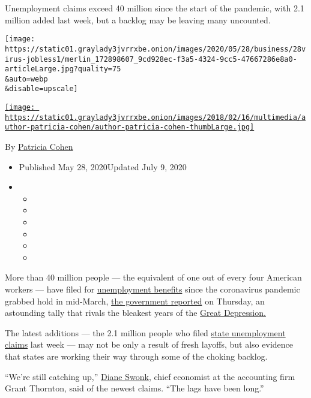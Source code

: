 Unemployment claims exceed 40 million since the start of the pandemic,
with 2.1 million added last week, but a backlog may be leaving many
uncounted.

\texttt{[image: https://static01.graylady3jvrrxbe.onion/images/2020/05/28/business/28virus-jobless1/merlin\_172898607\_9cd928ec-f3a5-4324-9cc5-47667286e8a0-articleLarge.jpg?quality=75\\\&auto=webp\\\&disable=upscale]}

\href{https://www.nytimes3xbfgragh.onion/by/patricia-cohen}{\texttt{[image: https://static01.graylady3jvrrxbe.onion/images/2018/02/16/multimedia/author-patricia-cohen/author-patricia-cohen-thumbLarge.jpg]}}

By \href{https://www.nytimes3xbfgragh.onion/by/patricia-cohen}{Patricia
Cohen}

\begin{itemize}
\item
  Published May 28, 2020Updated July 9, 2020
\item
  \begin{itemize}
  \item
  \item
  \item
  \item
  \item
  \item
  \end{itemize}
\end{itemize}

More than 40 million people --- the equivalent of one out of every four
American workers --- have filed for
\href{https://www.nytimes3xbfgragh.onion/2020/06/11/us/politics/unemployment-benefits-coronavirus.html}{unemployment
benefits} since the coronavirus pandemic grabbed hold in mid-March,
\href{https://www.dol.gov/ui/data.pdf}{the government reported} on
Thursday, an astounding tally that rivals the bleakest years of the
\href{https://www.thebalance.com/unemployment-rate-by-year-3305506}{Great
Depression.}

The latest additions --- the 2.1 million people who filed
\href{https://www.nytimes3xbfgragh.onion/2020/07/09/business/economy/unemployment-claims-coronavirus.html}{state
unemployment claims} last week --- may not be only a result of fresh
layoffs, but also evidence that states are working their way through
some of the choking backlog.

``We're still catching up,'' \href{https://twitter.com/DianeSwonk}{Diane
Swonk}, chief economist at the accounting firm Grant Thornton, said of
the newest claims. ``The lags have been long.''

